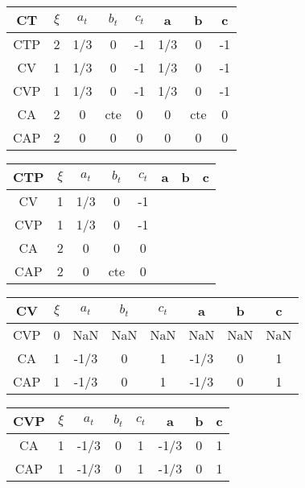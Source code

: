 \documentclass[twocolumn]{article}
\begin{document}
\begin{table}[H]
	\begin{tabular}{|c|c|c|c|c|c|c|c|}
		\hline
		CT & $\xi $& $a_t$ & $b_t$ & $c_t$ & a & b & c \\
		\hline
		CTP & 2 & 1/3  & 0 & -1 & 1/3  & 0  &  -1 \\
		\hline
		CV & 1 & 1/3  & 0  & -1  & 1/3  & 0  &  -1 \\
		\hline
		CVP & 1 & 1/3  & 0  &  -1 & 1/3  & 0  & -1 \\
		\hline
		CA & 2 & 0  & cte  & 0  &  0 & cte &  0\\
		\hline
		CAP & 2 & 0  & 0 & 0  & 0  & 0  & 0\\
		\hline
	\end{tabular}
\end{table}

\begin{table}[H]
	\begin{tabular}{|c|c|c|c|c|c|c|c|}
		\hline
		CTP & $\xi $& $a_t$ & $b_t$ & $c_t$ & a & b & c \\
		\hline
		CV & 1 & 1/3  & 0 &  -1 &   &   &   \\
		\hline
		CVP & 1 &  1/3 & 0  &  -1 &   &   &   \\
		\hline
		CA & 2 & 0  & 0  & 0  &   &   &   \\
		\hline
		CAP & 2 &  0 &  cte & 0  &   &   &   \\
		\hline
	\end{tabular}
\end{table}

\begin{table}[H]
	\begin{tabular}{|c|c|c|c|c|c|c|c|}
		\hline
		CV & $\xi $& $a_t$ & $b_t$ & $c_t$ & a & b & c \\
		\hline
		CVP & 0  & NaN  & NaN  & NaN  & NaN  & NaN  & NaN  \\
		\hline
		CA & 1 & -1/3  & 0  & 1 & -1/3  & 0  & 1 \\
		\hline
		CAP & 1 & -1/3  & 0  & 1 & -1/3  & 0  & 1  \\
		\hline
	\end{tabular}
\end{table}


\begin{table}[H]
	\begin{tabular}{|c|c|c|c|c|c|c|c|}
		\hline
		CVP & $\xi $& $a_t$ & $b_t$ & $c_t$ & a & b & c \\
		\hline
		CA & 1 & -1/3  & 0 & 1  & -1/3  & 0 & 1   \\
		\hline
		CAP & 1 &  -1/3 & 0 & 1  & -1/3  & 0 & 1  \\
		\hline
	\end{tabular}
\end{table}
\end{document}
